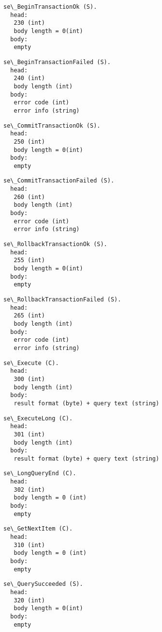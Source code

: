 \documentclass[a4paper,12pt]{article}
\begin{document}
\begin{verbatim}
se\_BeginTransactionOk (S).
  head:
   230 (int)
   body length = 0(int)
  body:
   empty
\end{verbatim}
   
\begin{verbatim}
se\_BeginTransactionFailed (S).
  head:
   240 (int)
   body length (int)
  body:
   error code (int)
   error info (string)
\end{verbatim}

\begin{verbatim}
se\_CommitTransactionOk (S).
  head:
   250 (int)
   body length = 0(int)
  body:
   empty
\end{verbatim}

\begin{verbatim}
se\_CommitTransactionFailed (S).
  head:
   260 (int)
   body length (int)
  body:
   error code (int)
   error info (string)
\end{verbatim}

\begin{verbatim}
se\_RollbackTransactionOk (S).
  head:
   255 (int)
   body length = 0(int)
  body:
   empty
\end{verbatim}

\begin{verbatim}
se\_RollbackTransactionFailed (S).
  head:
   265 (int)
   body length (int)
  body:
   error code (int)
   error info (string)
\end{verbatim}

\begin{verbatim}
se\_Execute (C).
  head:
   300 (int)
   body length (int)
  body:
   result format (byte) + query text (string)
\end{verbatim}

\begin{verbatim}
se\_ExecuteLong (C).
  head:
   301 (int)
   body length (int)
  body:
   result format (byte) + query text (string)
\end{verbatim}

\begin{verbatim}
se\_LongQueryEnd (C).
  head:
   302 (int)
   body length = 0 (int)
  body:
   empty
\end{verbatim}

\begin{verbatim}
se\_GetNextItem (C).
  head:
   310 (int)
   body length = 0 (int)
  body:
   empty
\end{verbatim}

\begin{verbatim}
se\_QuerySucceeded (S).
  head:
   320 (int)
   body length = 0(int)
  body:
   empty
\end{verbatim}
\end{document}
